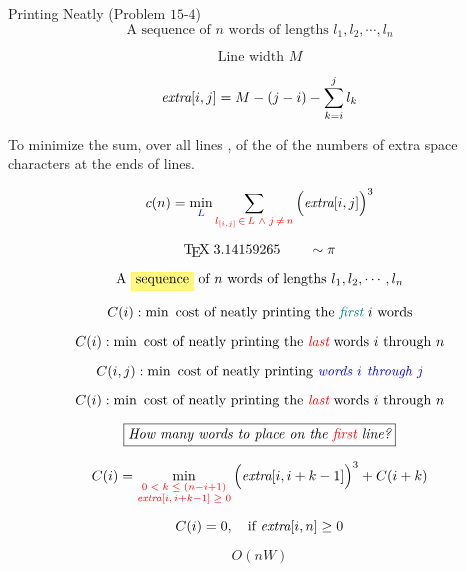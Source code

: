 
\begin{frame}{}
  \begin{exampleblock}{Printing Neatly (Problem $15$-$4$)}
    \[
      \text{A sequence of $n$ words of lengths } l_1, l_2, \cdots, l_n
    \]

    \[
      \text{Line width } M
    \]

    \[
      \text{\it extra}[i,j] = M - (j-i) - \sum_{k=i}^{j} l_k
    \]

    \pause
    \begin{center}
      To minimize the sum, over all lines , of the  of the numbers of
      extra space characters at the ends of lines.
    \end{center}

    \[
      c(n) = \min_{\textcolor{blue}{L}} \sum_{\textcolor{red}{l_{[i,j]} \,\in\, L \;\land\; j \,\neq\, n}} \Big(\text{\it extra}[i,j]\Big)^3
    \]
  \end{exampleblock}
\end{frame}

\begin{frame}{}

  \pause
  \[
    \text{\TeX } \; 3.14159265 \qquad \sim \pi
  \]
\end{frame}

\begin{frame}{}
  \[
    \text{A \hl{yellow}{sequence} of $n$ words of lengths } l_1, l_2, \cdots, l_n
  \]

  \pause
  \vspace{0.50cm}
  \[
    C(i): \min \text{ cost of neatly printing the \textcolor{teal}{\it first} $i$ words}
  \]

  \[
    C(i): \min \text{ cost of neatly printing the \textcolor{red}{\it last} words $i$ through $n$}
  \]

  \[
    C(i,j): \min \text{ cost of neatly printing \textcolor{blue}{\it words $i$ through $j$}}
  \]
\end{frame}

\begin{frame}{}
  \[
    C(i): \min \text{ cost of neatly printing the \textcolor{red}{\it last} words $i$ through $n$}
  \]

  \pause
  \[
    \fbox{\text{\it How many words to place on the \textcolor{red}{first} line?}}
  \]

  \pause
  \vspace{0.50cm}
  \[
    C(i) = \min_{\textcolor{red}{\substack{0 \;<\; k \;\le\; (n-i+1) \\ \text{\it extra}[i,\, i+k-1] \;\ge\; 0}}} \Big(\text{\it extra}[i, i+k-1]\Big)^3 + C(i+k)
  \]

  \pause
  \vspace{0.30cm}
  \[
    C(i) = 0, \quad \text{if {\it extra}}[i,n] \ge 0 
  \]

  \pause
  \[
    O(nW)
  \]
\end{frame}

